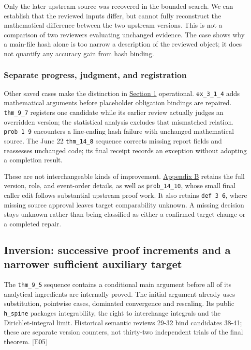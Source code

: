 Only the later upstream source was recovered in the bounded search. We can establish that the reviewed inputs differ, but cannot fully reconstruct the mathematical difference between the two upstream versions. This is not a comparison of two reviewers evaluating unchanged evidence. The case shows why a main-file hash alone is too narrow a description of the reviewed object; it does not quantify any accuracy gain from hash binding.

\subsubsection[Separate progress, judgment, and registration]{\texorpdfstring{\protect\hypertarget{l4-4}{}Separate progress, judgment, and registration}{Separate progress, judgment, and registration}}
Other saved cases make the distinction in \href{en.pdf\#section-1}{Section 1} operational. \nolinkurl{ex_3_1_4} adds mathematical arguments before placeholder obligation bindings are repaired. \nolinkurl{thm_9_7} registers one candidate while its earlier review actually judges an overridden version; the statistical analysis excludes that mismatched relation. \nolinkurl{prob_1_9} encounters a line-ending hash failure with unchanged mathematical source. The June 22 \nolinkurl{thm_14_8} sequence corrects missing report fields and reassesses unchanged code; its final receipt records an exception without adopting a completion result.

These are not interchangeable kinds of improvement. \hyperlink{appendix-b}{Appendix B} retains the full version, role, and event-order details, as well as \nolinkurl{prob_14_10}, whose small final caller edit follows substantial upstream proof work. It also retains \nolinkurl{def_3_6}, where missing source approval leaves target comparability unknown. A missing decision stays unknown rather than being classified as either a confirmed target change or a completed repair.

\subsection[Inversion: successive proof increments and a narrower sufficient auxiliary target]{\texorpdfstring{\protect\hypertarget{l5}{}Inversion: successive proof increments and a narrower sufficient auxiliary target}{Inversion: successive proof increments and a narrower sufficient auxiliary target}}
The \nolinkurl{thm_9_5} sequence contains a conditional main argument before all of its analytical ingredients are internally proved. The initial argument already uses substitution, pointwise cases, dominated convergence and rescaling. Its public \nolinkurl{h_spine} packages integrability, the right to interchange integrals and the Dirichlet-integral limit. Historical semantic reviews 29-32 bind candidates 38-41; these are separate version counters, not thirty-two independent trials of the final theorem. [E05]

